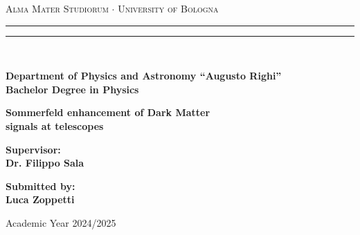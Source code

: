 \begin{titlepage}
\begin{center}
{{\Large{\textsc{Alma Mater Studiorum $\cdot$ University of Bologna}}}} 
\rule[0.1cm]{15.8cm}{0.1mm}
\rule[0.5cm]{15.8cm}{0.6mm}
\\\vspace{3mm}

{\small{\bf Department of Physics and Astronomy “Augusto Righi”\\
Bachelor Degree in Physics}}

\end{center}

\vspace{23mm}

\begin{center}
{\LARGE{\bf Sommerfeld enhancement of Dark Matter\\[6pt]signals at telescopes}}\\
\end{center}

\vspace{50mm} \par \noindent

\begin{minipage}[t]{0.47\textwidth}
{\large{\bf Supervisor: \vspace{2mm}\\
Dr. Filippo Sala}}
\end{minipage}
%
\hfill
%
\begin{minipage}[t]{0.47\textwidth}\raggedleft
{\large{\bf Submitted by:
\vspace{2mm}\\
Luca Zoppetti}}
\end{minipage}

\vspace{40mm}

\begin{center}
Academic Year 2024/2025
\end{center}

\end{titlepage}